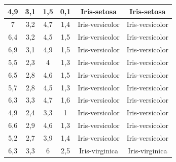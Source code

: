 \documentclass{VUMIFPSbakalaurinis}
\begin{document}
\begin{table}[]
{\begin{tabular}{|c|c|c|c|c|c|}
  4,9                  & 3,1                 & 1,5                  & 0,1                 & Iris-setosa                           & Iris-setosa                            \\ \hline
  7                    & 3,2                 & 4,7                  & 1,4                 & Iris-versicolor                       & Iris-versicolor                        \\ \hline
  6,4                  & 3,2                 & 4,5                  & 1,5                 & Iris-versicolor                       & Iris-versicolor                        \\ \hline
  6,9                  & 3,1                 & 4,9                  & 1,5                 & Iris-versicolor                       & Iris-versicolor                        \\ \hline
  5,5                  & 2,3                 & 4                    & 1,3                 & Iris-versicolor                       & Iris-versicolor                        \\ \hline
  6,5                  & 2,8                 & 4,6                  & 1,5                 & Iris-versicolor                       & Iris-versicolor                        \\ \hline
  5,7                  & 2,8                 & 4,5                  & 1,3                 & Iris-versicolor                       & Iris-versicolor                        \\ \hline
  6,3                  & 3,3                 & 4,7                  & 1,6                 & Iris-versicolor                       & Iris-versicolor                        \\ \hline
  4,9                  & 2,4                 & 3,3                  & 1                   & Iris-versicolor                       & Iris-versicolor                        \\ \hline
  6,6                  & 2,9                 & 4,6                  & 1,3                 & Iris-versicolor                       & Iris-versicolor                        \\ \hline
  5,2                  & 2,7                 & 3,9                  & 1,4                 & Iris-versicolor                       & Iris-versicolor                        \\ \hline
  6,3                  & 3,3                 & 6                    & 2,5                 & Iris-virginica                        & Iris-virginica                         \\ \hline

\end{tabular}}
\end{table}
\end{document}
